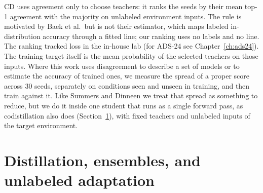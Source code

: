 CD uses agreement only to choose
teachers: it ranks the seeds by their mean top-1 agreement with the
majority on unlabeled environment inputs. The rule is motivated by
Baek et al.\ but is not their estimator, which maps labeled
in-distribution accuracy through a fitted line; our ranking uses no
labels and no line.
The ranking tracked loss in the in-house lab (for ADS-24 see
Chapter~\ref{ch:ads24}). The training target itself is the mean
probability of the selected teachers on those inputs.
Where this work uses disagreement to describe a set of models or to
estimate the accuracy of trained ones, we measure the spread of a
proper score across 30 seeds, separately on conditions seen and unseen
in training, and then train against it. Like Summers and Dinneen we
treat that spread as something to reduce, but we do it inside one
student that runs as a single forward pass, as codistillation also does
(Section~\ref{sec:related-distillation}), with fixed teachers and
unlabeled inputs of the target environment.

\section{Distillation, ensembles, and unlabeled adaptation}
\label{sec:related-distillation}

